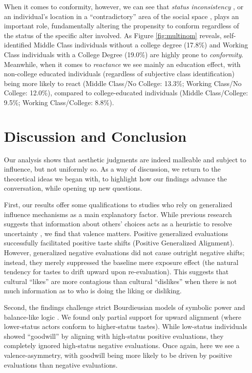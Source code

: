 \documentclass[12pt, letterpaper]{article}
\begin{document}
When it comes to conformity, however, we can see that \textit{status inconsistency} \citep{stryker1978status-d86}, or an individual's location in a ``contradictory'' area of the social space \citep{bourdieu1984}, plays an important role, fundamentally altering the propensity to conform regardless of the status of the specific alter involved. As Figure \ref{fig:multinom} reveals, self-identified Middle Class individuals without a college degree (17.8\%) and Working Class individuals with a College Degree (19.0\%) are highly prone to \textit{conformity}. Meanwhile, when it comes to \textit{reactance} we see mainly an education effect, with non-college educated individuals (regardless of subjective class identification) being more likely to react (Middle Class/No College: 13.3\%; Working Class/No College: 12.0\%), compared to college-educated individuals (Middle Class/College: 9.5\%; Working Class/College: 8.8\%). 

\section{Discussion and Conclusion}
Our analysis shows that aesthetic judgments are indeed malleable and subject to influence, but not uniformly so. As a way of discussion, we return to the theoretical ideas we began with, to highlight how our findings advance the conversation, while opening up new questions. 

First, our results offer some qualifications to studies who rely on generalized influence mechanisms as a main explanatory factor. While previous research suggests that information about others' choices acts as a heuristic to resolve uncertainty \citep{strang2001search-10a, salganik2006experimental-88d}, we find that valence matters. Positive generalized evaluations successfully facilitated positive taste shifts (Positive Generalized Alignment). However, generalized negative evaluations did not cause outright negative shifts; instead, they merely suppressed the baseline mere exposure effect (the natural tendency for tastes to drift upward upon re-evaluation). This suggests that cultural ``likes'' are more contagious than cultural ``dislikes'' when there is not much information as to who is doing the liking or disliking.

Second, the findings challenge strict Bourdieusian models of symbolic power and balance-like logic \citep{heider1946attitudes-ff3, bourdieu1984}. We found only partial support for upward alignment (where lower-status actors conform to higher-status tastes). While low-status individuals showed ``goodwill'' by aligning with high-status positive evaluations, they completely ignored high-status negative evaluations. Once again, here we see a valence-asymmetry, with goodwill being more likely to be driven by positive evaluations than negative evaluations. 
\end{document}
